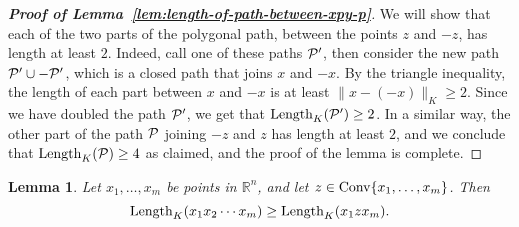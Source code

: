 \documentclass[11pt]{article}
\newtheorem{lemma}{Lemma}[section]
\begin{document}
{\begin{proof}[{\bf Proof of Lemma~\ref{lem:length-of-path-between-xpy-p}}] 
We will show that each of the two parts of the polygonal path, 
between the points $z$ and
$-z$, has length at least $2$. Indeed, call one of these paths ${\cal P}'$, then %
consider the new path ${\cal P}' \cup -{\cal P}'$, which is a closed path that
joins $x$ and $-x$. By the triangle inequality, the length
of each part between $x$ and $-x$ is at least $\|x - (-x)\|_K \ge 2$.
Since we have doubled the path ${\cal P}'$, we get that ${\rm Length}_K({\cal P}') \ge 2$.
In a similar way, the other part of the path ${\cal P}$ joining $-z$ and $z$ has length
at least $2$, and we conclude that ${\rm Length}_K({\cal P}) \ge 4$ as claimed, and the proof of the lemma is complete.  
\end{proof}


\begin{lemma} \label{Lemma-about-short-cuts} Let $x_1,\ldots,x_m$ be 
points in ${\mathbb R}^n$, %
and  let $z \in {\rm Conv}\{x_1,\ldots,x_m\}$. Then $${\rm
Length}_K(x_1x_2\cdots x_m) \geq {\rm Length}_K(x_1 z x_m).$$
\end{lemma}


\begin{figure}[h!]
\begin{center}
\end{center}
\end{figure}}
\end{document}
